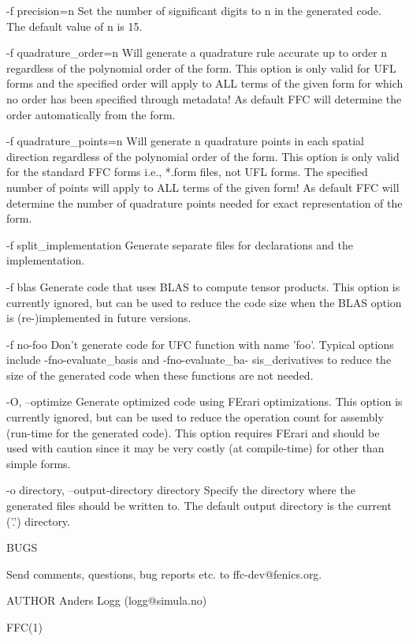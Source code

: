       -f precision=n
              Set the number of significant digits to n in the generated code.
              The default value of n is 15.

       -f quadrature_order=n
              Will generate a quadrature rule accurate up to order n regardless
              of the polynomial order of the form. This option is only valid
              for UFL forms and the specified order will apply to ALL terms of
              the given form for which no order has been specified through
              metadata! As default FFC will determine the order automatically
              from the form.

       -f quadrature_points=n
              Will generate n quadrature points in each spatial direction
              regardless of the polynomial order of the form. This option is
              only valid for the standard FFC forms i.e., *.form files, not
              UFL forms. The specified number of points will apply to ALL terms
              of the given form! As default FFC will determine the number of
              quadrature points needed for exact representation of the form.

       -f split_implementation
              Generate separate files for declarations and the implementation.

       -f blas
              Generate  code that uses BLAS to compute tensor products.  This
              option is currently ignored, but can be used to reduce the code
              size when the BLAS option is (re-)implemented in future versions.

       -f no-foo
              Don't generate code for UFC function with name 'foo'. Typical
              options   include   -fno-evaluate_basis   and  -fno-evaluate_ba-
              sis_derivatives to reduce the size  of  the generated code when
              these functions are not needed.

       -O, --optimize
              Generate optimized code using FErari optimizations. This  option
              is  currently  ignored,  but can be used to reduce the operation
              count for assembly  (run-time  for  the  generated  code).  This
              option  requires FErari and should be used with caution since it
              may be very costly  (at  compile-time)  for  other  than  simple
              forms.

       -o directory, --output-directory directory
              Specify the directory where the generated files should be written
              to. The default output directory is the current ('.') directory.

       BUGS

       Send comments, questions, bug reports etc. to ffc-dev@fenics.org.

AUTHOR
       Anders Logg (logg@simula.no)

                                                                        FFC(1)
